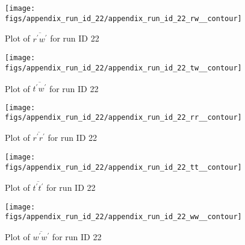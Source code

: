 \begin{figure}[H]
\centering
\texttt{[image: figs/appendix\_run\_id\_22/appendix\_run\_id\_22\_rw\_\_contour]}
\caption{Plot of $\overline{r^\prime w^\prime}$ for run ID 22}
\label{fig:appendix_run_id_22_rw__contour}
\end{figure}


\begin{figure}[H]
\centering
\texttt{[image: figs/appendix\_run\_id\_22/appendix\_run\_id\_22\_tw\_\_contour]}
\caption{Plot of $\overline{t^\prime w^\prime}$ for run ID 22}
\label{fig:appendix_run_id_22_tw__contour}
\end{figure}


\begin{figure}[H]
\centering
\texttt{[image: figs/appendix\_run\_id\_22/appendix\_run\_id\_22\_rr\_\_contour]}
\caption{Plot of $\overline{r^\prime r^\prime}$ for run ID 22}
\label{fig:appendix_run_id_22_rr__contour}
\end{figure}


\begin{figure}[H]
\centering
\texttt{[image: figs/appendix\_run\_id\_22/appendix\_run\_id\_22\_tt\_\_contour]}
\caption{Plot of $\overline{t^\prime t^\prime}$ for run ID 22}
\label{fig:appendix_run_id_22_tt__contour}
\end{figure}


\begin{figure}[H]
\centering
\texttt{[image: figs/appendix\_run\_id\_22/appendix\_run\_id\_22\_ww\_\_contour]}
\caption{Plot of $\overline{w^\prime w^\prime}$ for run ID 22}
\label{fig:appendix_run_id_22_ww__contour}
\end{figure}


